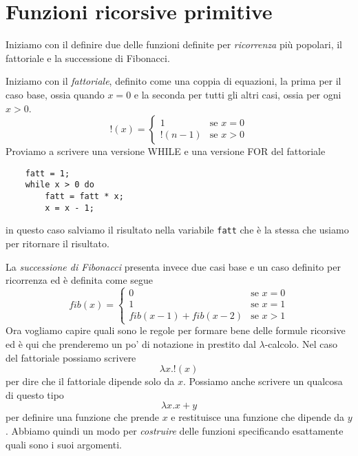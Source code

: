 \section{Funzioni ricorsive primitive}
Iniziamo con il definire due delle funzioni definite per
\emph{ricorrenza} più popolari, il fattoriale e la successione
di Fibonacci.

Iniziamo con il \emph{fattoriale}, definito come una coppia
di equazioni, la prima per il caso base, ossia quando $x = 0$
e la seconda per tutti gli altri casi, ossia per ogni $x > 0$.
\[
	!(x) = \begin{cases}
		1        & \text{se } x = 0 \\
		!(n - 1) & \text{se } x > 0
	\end{cases}
\]
Proviamo a scrivere una versione WHILE e una versione FOR del
fattoriale
\begin{verbatim}
    fatt = 1;
    while x > 0 do
        fatt = fatt * x;
        x = x - 1;
\end{verbatim}
in questo caso salviamo il risultato nella variabile
\verb|fatt| che è la stessa che usiamo per ritornare il
risultato.

La \emph{successione di Fibonacci} presenta invece due casi
base e un caso definito per ricorrenza ed è definita come
segue
\[
	fib(x) = \begin{cases}
		0                       & \text{se } x = 0 \\
		1                       & \text{se } x = 1 \\
		fib(x - 1) + fib(x - 2) & \text{se } x > 1
	\end{cases}
\]
Ora vogliamo capire quali sono le regole per formare bene
delle formule ricorsive ed è qui che prenderemo un po' di
notazione in prestito dal $\lambda$-calcolo. Nel caso del
fattoriale possiamo scrivere
\[ \lambda x . !(x) \]
per dire che il fattoriale dipende solo da $x$. Possiamo anche
scrivere un qualcosa di questo tipo
\[ \lambda x . x + y \]
per definire una funzione che prende $x$ e restituisce una
funzione che dipende da $y$. Abbiamo quindi un modo per
\emph{costruire} delle funzioni specificando esattamente quali
sono i suoi argomenti.


